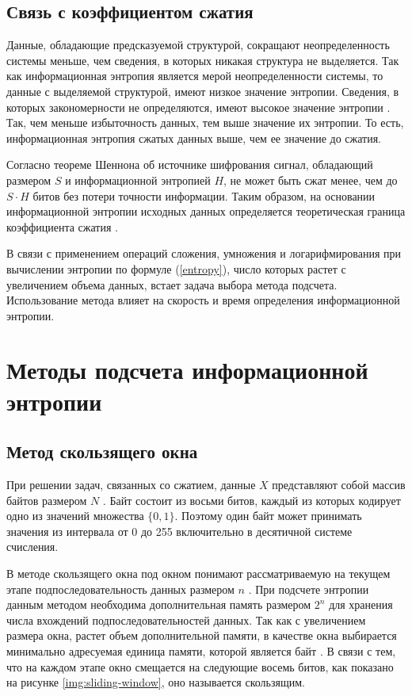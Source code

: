 \subsection{Связь с коэффициентом сжатия}

Данные, обладающие предсказуемой структурой, сокращают неопределенность системы меньше, чем сведения, в которых никакая структура не выделяется. Так как информационная энтропия является мерой неопределенности системы, то данные с выделяемой структурой, имеют низкое значение энтропии. Сведения, в которых закономерности не определяются, имеют высокое значение энтропии \cite{relation}. Так, чем меньше избыточность данных, тем выше значение их энтропии. То есть, информационная энтропия сжатых данных выше, чем ее значение до сжатия.

Согласно теореме Шеннона об источнике шифрования сигнал, обладающий размером $S$ и информационной энтропией $H$, не может быть сжат менее, чем до $S \cdot H$ битов без потери точности информации. Таким образом, на основании информационной энтропии исходных данных определяется теоретическая граница коэффициента сжатия \cite{theorem}.

В связи с применением операций сложения, умножения и логарифмирования при вычислении энтропии по формуле (\ref{entropy}), число которых растет с увеличением объема данных, встает задача выбора метода подсчета. Использование метода влияет на скорость и время определения информационной энтропии.

\section{Методы подсчета информационной энтропии}

\subsection{Метод скользящего окна}

При решении задач, связанных со сжатием, данные $X$ представляют собой массив байтов размером $N$ \cite{bytes}. Байт состоит из восьми битов, каждый из которых кодирует одно из значений множества $\{0, 1\}$. Поэтому один байт может принимать значения из интервала от 0 до 255 включительно в десятичной системе счисления. 

В методе скользящего окна под окном понимают рассматриваемую на текущем этапе подпоследовательность данных размером $n$ \cite{sliding-window-method}. При подсчете энтропии данным методом необходима дополнительная память размером $2^n$ для хранения числа вхождений подпоследовательностей данных. Так как с увеличением размера окна, растет объем дополнительной памяти, в качестве окна выбирается минимально адресуемая единица памяти, которой является байт \cite{memory-unit}. В связи с тем, что на каждом этапе окно смещается на следующие восемь битов, как показано на рисунке \ref{img:sliding-window}, оно называется скользящим.


